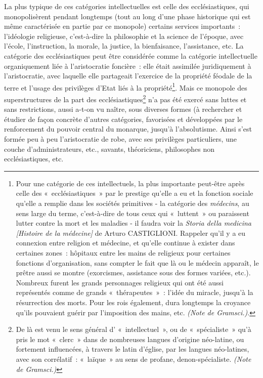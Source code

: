 \documentclass[french,twoside]{book} %
\begin{document}
\begin{enumerate}[itemsep=\baselineskip,]
 La plus typique de ces catégories intellectuelles est celle des ecclésiastiques, qui monopolisèrent pendant longtemps (tout au long d’une phase historique qui est même caractérisée en partie par ce monopole) certains services importants : l’idéologie religieuse, c’est-à-dire la philosophie et la science de l’époque, avec l’école, l’instruction, la morale, la justice, la bienfaisance, l’assistance, etc. La catégorie des ecclésiastiques peut être considérée comme la catégorie intellectuelle organiquement liée à l’aristocratie foncière : elle était assimilée juridiquement à l’aristocratie, avec laquelle elle partageait l’exercice de la propriété féodale de la terre et l’usage des privilèges d’Etat liés à la propriété\footnote{Pour une catégorie de ces intellectuels, la plus importante peut-être après celle des « ecclésiastiques » par le prestige qu’elle a eu et la fonction sociale qu’elle a remplie dans les sociétés primitives - la catégorie des \emph{médecins}, au sens large du terme, c’est-à-dire de tous ceux qui « luttent » ou paraissent lutter contre la mort et les maladies - il faudra voir la \emph{Storia della medicina [Histoire de la médecine]} de Arturo CASTIGLIONI. Rappeler qu’il y a eu connexion entre religion et médecine, et qu’elle continue à exister dans certaines zones : hôpitaux entre les mains de religieux pour certaines fonctions d’organisation, sans compter le fait que là ou le médecin apparaît, le prêtre aussi se montre (exorcismes, assistance sous des formes variées, etc.). Nombreux furent les grands personnages religieux qui ont été aussi représentés comme de grands « thérapeutes » : l’idée du miracle, jusqu’à la résurrection des morts. Pour les rois également, dura longtemps la croyance qu’ils pouvaient guérir par l’imposition des mains, etc. \emph{(Note de Gramsci.)}.}. Mais ce monopole des superstructures de la part des ecclésiastiques\footnote{De là est venu le sens général d’ « intellectuel », ou de « spécialiste » qu’à pris le mot « clerc » dans de nombreuses langues d’origine néo-latine, ou fortement influencées, à travers le latin d’église, par les langues néo-latines, avec son corrélatif : « laïque » au sens de profane, denon-spécialiste. \emph{(Note de Gramsci.)}} n’a pas été exercé sans luttes et sans restrictions, aussi a-t-on vu naître, sous diverses formes (à rechercher et étudier de façon concrète d’autres catégories, favorisées et développées par le renforcement du pouvoir central du monarque, jusqu’à l’absolutisme. Ainsi s’est formée peu à peu l’aristocratie de robe, avec ses privilèges particuliers, une couche d’administrateurs, etc., savants, théoriciens, philosophes non ecclésiastiques, etc.\par

\end{enumerate}
\end{document}

